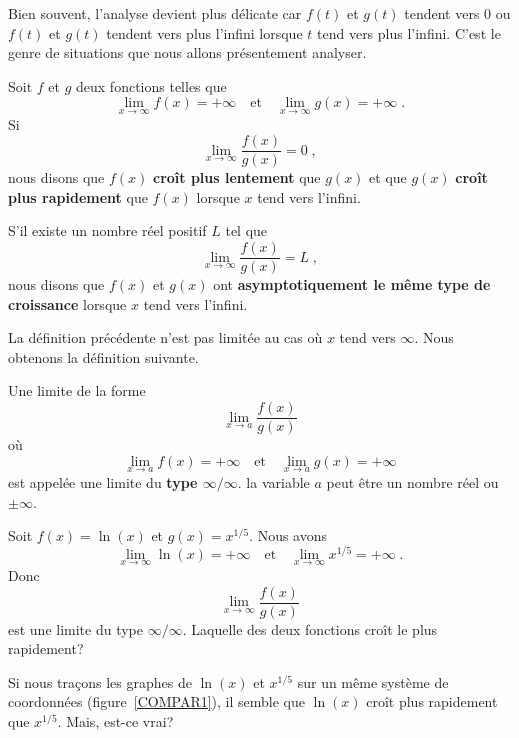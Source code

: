 {Bien souvent, l'analyse devient plus délicate car $f(t)$ et $g(t)$
tendent vers $0$ ou $f(t)$ et $g(t)$ tendent vers plus l'infini
lorsque $t$ tend vers plus l'infini.  C'est le genre de situations que
nous allons présentement analyser.

\begin{focus}{\dfn} 
Soit $f$ et $g$ deux fonctions telles que
\[
\lim_{x\rightarrow \infty} f(x) = +\infty \quad \text{et} \quad
\lim_{x\rightarrow \infty} g(x) = +\infty \; .
\]
Si
\[
\lim_{x \rightarrow \infty} \frac{f(x)}{g(x)} = 0 \; ,
\]
nous disons que $f(x)$ {\bfseries croît plus lentement} que $g(x)$ et que
$g(x)$ {\bfseries croît plus rapidement} que $f(x)$ lorsque $x$ tend
vers l'infini.

S'il existe un nombre réel positif $L$ tel que
\[
\lim_{x \rightarrow \infty} \frac{f(x)}{g(x)} = L \; ,
\]
nous disons que $f(x)$ et $g(x)$ ont
{\bfseries asymptotiquement le même type de croissance} lorsque $x$
tend vers l'infini.
\label{DAasymptinfty}
\end{focus}

La définition précédente n'est pas limitée au cas où $x$ tend vers
$\infty$.  Nous obtenons la définition suivante.

\begin{focus}{\dfn}
Une limite de la forme
\[
\lim_{x \rightarrow a} \frac{f(x)}{g(x)}
\]
où
\[
\lim_{x\rightarrow a} f(x) = +\infty \quad \text{et} \quad
\lim_{x\rightarrow a} g(x) = +\infty
\]
est appelée une limite du {\bfseries type $\infty/\infty$}.  la
variable $a$ peut être un nombre réel ou $\pm \infty$.
\end{focus}

\begin{egg}
Soit $f(x) = \ln(x)$ et $g(x)=x^{1/5}$.  Nous avons
\[
\lim_{x\rightarrow \infty} \ln(x) = +\infty \quad \text{et} \quad
\lim_{x\rightarrow \infty} x^{1/5} = +\infty \; .
\]
Donc
\[
\lim_{x \rightarrow \infty} \frac{f(x)}{g(x)}
\]
est une limite du type $\infty/\infty$.  Laquelle des deux fonctions
croît le plus rapidement?

Si nous traçons les graphes de $\ln(x)$ et $x^{1/5}$ sur un même système
de coordonnées (figure~\ref{COMPAR1}), il semble que $\ln(x)$
croît plus rapidement que $x^{1/5}$.  Mais, est-ce vrai?


\end{egg}}
